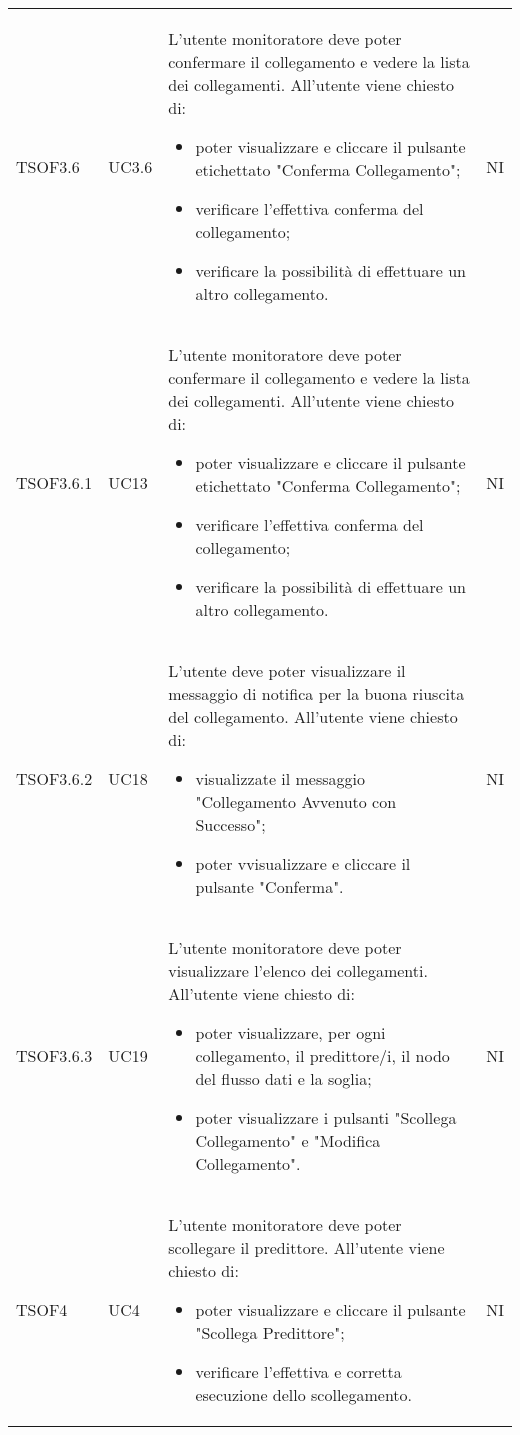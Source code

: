 \begin{longtable}{C{2.5cm} C{2.5cm} L{8cm} C{2cm}}
TSOF3.6 &
UC3.6 &
L'utente monitoratore deve poter confermare il collegamento e vedere la lista dei collegamenti. All'utente viene chiesto di:
\begin{itemize}
	\item poter visualizzare e cliccare il pulsante etichettato "Conferma Collegamento";
	\item verificare l'effettiva conferma del collegamento;
	\item verificare la possibilità di effettuare un altro collegamento.
\end{itemize}&
NI \\

TSOF3.6.1 &
UC13 &
L'utente monitoratore deve poter confermare il collegamento e vedere la lista dei collegamenti. All'utente viene chiesto di:
\begin{itemize}
	\item poter visualizzare e cliccare il pulsante etichettato "Conferma Collegamento";
	\item verificare l'effettiva conferma del collegamento;
	\item verificare la possibilità di effettuare un altro collegamento.
\end{itemize}&
NI \\
TSOF3.6.2 &
UC18 &
L'utente deve poter visualizzare il messaggio di notifica per la buona riuscita del collegamento. All'utente viene chiesto di:
\begin{itemize}
	\item visualizzate il messaggio "Collegamento Avvenuto con Successo";
	\item poter vvisualizzare e cliccare il pulsante "Conferma".
\end{itemize} &
NI \\

TSOF3.6.3 &
UC19 &
L'utente monitoratore deve poter visualizzare l'elenco dei collegamenti. All'utente viene chiesto di:
\begin{itemize}
	\item poter visualizzare, per ogni collegamento, il predittore/i, il nodo del flusso dati e la soglia;
	\item poter visualizzare i pulsanti "Scollega Collegamento" e "Modifica Collegamento".
\end{itemize}&
NI \\


TSOF4 &
UC4 &
L'utente monitoratore deve poter scollegare il predittore. All'utente viene chiesto di:
\begin{itemize}
	\item poter visualizzare e cliccare il pulsante "Scollega Predittore";
	\item verificare l'effettiva e corretta esecuzione dello scollegamento.
\end{itemize}&
NI \\



\end{longtable}

